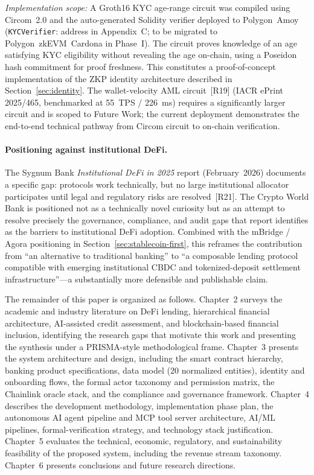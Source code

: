 \documentclass[12pt,a4paper]{report}
\begin{document}
\begin{description}[leftmargin=0pt]
\textit{Implementation scope:} A Groth16 KYC age-range circuit was compiled using Circom~2.0 and the auto-generated Solidity verifier deployed to Polygon~Amoy (\texttt{KYCVerifier}: address in Appendix~C; to be migrated to Polygon~zkEVM~Cardona in Phase~I). The circuit proves knowledge of an age satisfying KYC eligibility without revealing the age on-chain, using a Poseidon hash commitment for proof freshness. This constitutes a proof-of-concept implementation of the ZKP identity architecture described in Section~\ref{sec:identity}. The wallet-velocity AML circuit~[R19] (IACR ePrint 2025/465, benchmarked at 55~TPS / 226~ms) requires a significantly larger circuit and is scoped to Future Work; the current deployment demonstrates the end-to-end technical pathway from Circom circuit to on-chain verification.

\end{description}

\paragraph{Positioning against institutional DeFi.}
The Sygnum Bank \textit{Institutional DeFi in 2025} report (February~2026) documents a specific gap: protocols work technically, but no large institutional allocator participates until legal and regulatory risks are resolved~[R21]. The Crypto World Bank is positioned not as a technically novel curiosity but as an attempt to resolve precisely the governance, compliance, and audit gaps that report identifies as the barriers to institutional DeFi adoption. Combined with the mBridge / Agora positioning in Section~\ref{sec:stablecoin-first}, this reframes the contribution from ``an alternative to traditional banking'' to ``a composable lending protocol compatible with emerging institutional CBDC and tokenized-deposit settlement infrastructure''---a substantially more defensible and publishable claim.

The remainder of this paper is organized as follows. Chapter~2 surveys the academic and industry literature on DeFi lending, hierarchical financial architecture, AI-assisted credit assessment, and blockchain-based financial inclusion, identifying the research gaps that motivate this work and presenting the synthesis under a PRISMA-style methodological frame. Chapter~3 presents the system architecture and design, including the smart contract hierarchy, banking product specifications, data model (20 normalized entities), identity and onboarding flows, the formal actor taxonomy and permission matrix, the Chainlink oracle stack, and the compliance and governance framework. Chapter~4 describes the development methodology, implementation phase plan, the autonomous AI agent pipeline and MCP tool server architecture, AI/ML pipelines, formal-verification strategy, and technology stack justification. Chapter~5 evaluates the technical, economic, regulatory, and sustainability feasibility of the proposed system, including the revenue stream taxonomy. Chapter~6 presents conclusions and future research directions.
\end{document}
